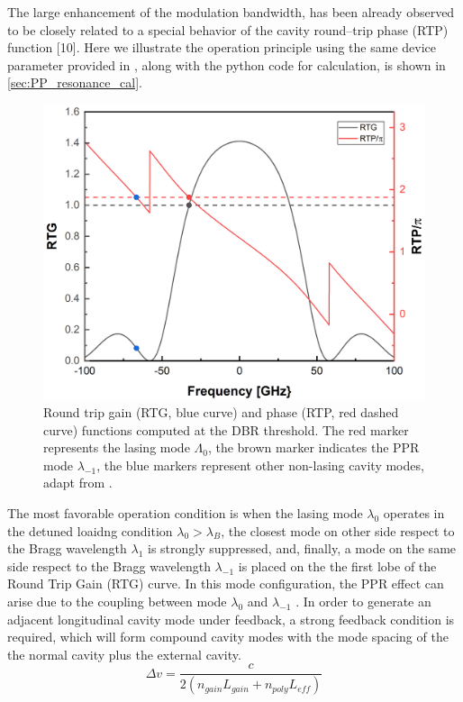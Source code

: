 The large enhancement of the modulation bandwidth, has been already observed to be closely related to a special behavior of the cavity round–trip phase (RTP) function [10]. Here we illustrate the operation principle using the same device parameter provided in \cite{montrosset2014laser}, along with the python code for calculation, is shown in \autoref{sec:PP_resonance_cal}.
\begin{figure}[ht]
    \centering
    \includegraphics[width=.6\linewidth]{figures/PP_resonance_operation_principle.png}
    \caption{Round trip gain (RTG, blue curve) and phase (RTP, red dashed curve) functions computed at the DBR threshold. The red marker represents the lasing mode $\Lambda_0$, the brown marker indicates the PPR mode $\lambda_{-1}$, the blue markers represent other non-lasing cavity modes, adapt from \cite{montrosset2014laser}.}
    \label{fig:PP_resonance_operation_principle}
\end{figure}

The most favorable operation condition is when the lasing mode $\lambda_0$ operates in the detuned loaidng condition $\lambda_0>\lambda_B$, the closest mode on other side respect to the Bragg wavelength $\lambda_1$ is strongly suppressed, and, finally, a mode on the same side respect to the Bragg wavelength $\lambda_{-1}$ is placed on the the first lobe of the Round Trip Gain (RTG) curve. In this mode configuration, the PPR effect can arise due to the coupling between mode $\lambda_0$ and $\lambda_{-1}$ \cite{montrosset2014laser}. In order to generate an adjacent longitudinal cavity mode under feedback, a strong feedback condition is required, which will form compound cavity modes with the mode spacing of the the normal cavity plus the external cavity.
\begin{equation}
    \Delta v=\frac{c}{2(n_{gain}L_{gain}+n_{poly}L_{eff})}
    \label{mode_spacing}
\end{equation}

